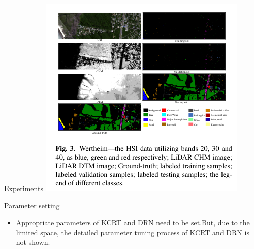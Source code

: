 \documentclass{beamer}
\begin{document}
\begin{frame}{Experiments}
    \includegraphics[scale=0.4]{fig3}
    \begin{block}{Parameter setting}
        \begin{itemize}
            \item Appropriate parameters of KCRT and DRN need to be set.But, due to the limited space, the detailed parameter tuning process of KCRT and DRN is not shown.
         \end{itemize}
    \end{block}
\end{frame}
\end{document}
